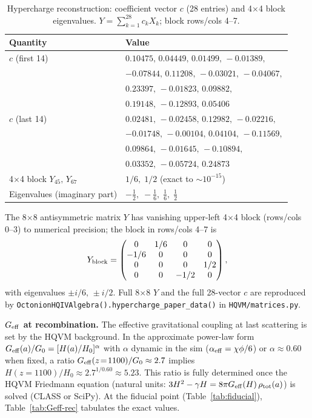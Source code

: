 \documentclass[12pt,a4paper]{article}
\begin{document}
\begin{table}[htbp]
\centering
\small
\caption{Hypercharge reconstruction: coefficient vector \(c\) (28 entries) and 4\(\times\)4 block eigenvalues. \(Y = \sum_{k=1}^{28} c_k X_k\); block rows/cols 4--7.}
\label{tab:hypercharge-numeric}
\small
\begin{tabular}{@{}p{2.2cm}p{8.8cm}@{}}
\toprule
Quantity & Value \\
\midrule
\(c\) (first 14) & \(0.10475,\, 0.04449,\, 0.01499,\,-0.01389,\)\\
& \(-0.07844,\, 0.11208,\,-0.03021,\,-0.04067,\)\\
& \(0.23397,\,-0.01823,\, 0.09882,\)\\
& \(0.19148,\,-0.12893,\, 0.05406\) \\
\(c\) (last 14) & \(0.02481,\,-0.02458,\, 0.12982,\,-0.02216,\)\\
& \(-0.01748,\,-0.00104,\, 0.04104,\,-0.11569,\)\\
& \(0.09864,\,-0.01645,\,-0.10894,\)\\
& \(0.03352,\,-0.05724,\, 0.24873\) \\
4\(\times\)4 block \(Y_{45},\, Y_{67}\) & \(1/6,\; 1/2\) (exact to \(\sim 10^{-15}\)) \\
Eigenvalues (imaginary part) & \(-\tfrac{1}{2},\; -\tfrac{1}{6},\; \tfrac{1}{6},\; \tfrac{1}{2}\) \\
\bottomrule
\end{tabular}
\end{table}

The 8\(\times\)8 antisymmetric matrix \(Y\) has vanishing upper-left 4\(\times\)4 block (rows/cols 0--3) to numerical precision; the block in rows/cols 4--7 is
\[
Y_{\rm block} = \begin{pmatrix} 0 & 1/6 & 0 & 0 \\ -1/6 & 0 & 0 & 0 \\ 0 & 0 & 0 & 1/2 \\ 0 & 0 & -1/2 & 0 \end{pmatrix},
\]
with eigenvalues \(\pm i/6,\, \pm i/2\). Full 8\(\times\)8 \(Y\) and the full 28-vector \(c\) are reproduced by \texttt{OctonionHQIVAlgebra().hypercharge\_paper\_data()} in \texttt{HQVM/matrices.py}.

\textbf{$G_{\rm eff}$ at recombination.}
The effective gravitational coupling at last scattering is set by the HQVM background. In the approximate power-law form $G_{\rm eff}(a)/G_0 = [H(a)/H_0]^\alpha$ with $\alpha$ dynamic in the sim ($\alpha_{\rm eff} = \chi\phi/6$) or $\alpha \approx 0.60$ when fixed, a ratio $G_{\rm eff}(z\!=\!1100)/G_0 \approx 2.7$ implies $H(z\!=\!1100)/H_0 \approx 2.7^{1/0.60} \approx 5.23$. This ratio is fully determined once the HQVM Friedmann equation (natural units: $3H^2 - \gamma H = 8\pi G_{\rm eff}(H)\,\rho_{\rm tot}(a)$) is solved (CLASS or SciPy). At the fiducial point (Table~\ref{tab:fiducial}), Table~\ref{tab:Geff-rec} tabulates the exact values.
\end{document}
